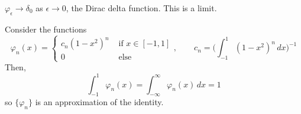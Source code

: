   \begin{definition}
    $\varphi_\epsilon \to \delta_0$ as $\epsilon \to 0$, the Dirac delta function. This is a limit. 
  \end{definition}

  \begin{theorem}
    Consider the functions 
    \begin{equation}
      \varphi_n (x) = \begin{cases} 
        c_n (1 - x^2)^n & \text{ if } x \in [-1, 1] \\ 
        0 & \text{ else }
      \end{cases}, \qquad c_n = \bigg( \int_{-1}^1 (1 - x^2)^n \,dx \bigg)^{-1}
    \end{equation}
    Then, 
    \begin{equation}
      \int_{-1}^1 \varphi_n (x) = \int_{-\infty}^\infty \varphi_n (x) \,dx = 1
    \end{equation}
    so $\{\varphi_n\}$ is an approximation of the identity. 
  \end{theorem}

